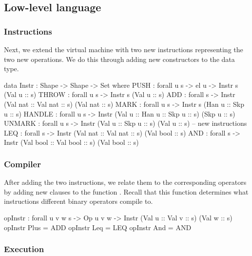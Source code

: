 
\subsection{Low-level language}

\subsubsection{Instructions}

Next, we extend the virtual machine with two new instructions representing
the two new operations. We do this through adding new constructors to the
 data type.

\begin{code}
  data Instr : Shape -> Shape -> Set where
    PUSH : forall {u s} -> el u -> Instr s (Val u :: s)
    THROW : forall {u s} -> Instr s (Val u :: s)
    ADD : forall {s} -> Instr (Val nat :: Val nat :: s) (Val nat :: s)
    MARK : forall {u s} -> Instr s (Han u :: Skp u :: s)
    HANDLE : forall {u s} -> Instr (Val u :: Han u :: Skp u :: s) (Skp u :: s)
    UNMARK : forall {u s} -> Instr (Val u :: Skp u :: s) (Val u :: s)
    --  new instructions
    LEQ : forall {s} -> Instr (Val nat :: Val nat :: s) (Val bool :: s)
    AND : forall {s} -> Instr (Val bool :: Val bool :: s) (Val bool :: s)
\end{code}

\subsubsection{Compiler}

After adding the two instructions, we relate them to the corresponding operators
by adding new clauses to the function . Recall that this
function determines what instructions different binary operators compile to.

\begin{code}
  opInstr : forall {u v w s} -> Op u v w -> Instr (Val u :: Val v :: s) (Val w :: s)
  opInstr Plus = ADD
  opInstr Leq = LEQ
  opInstr And = AND
\end{code}

\subsubsection{Execution}

